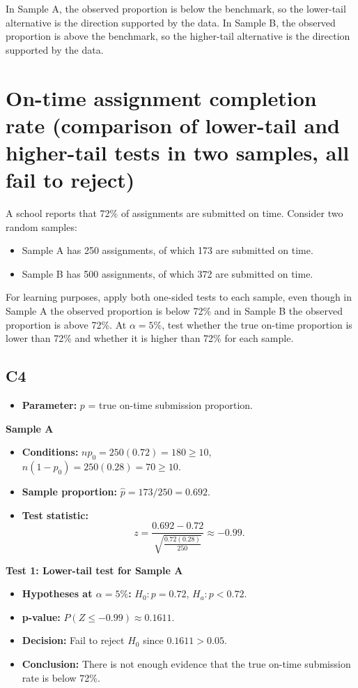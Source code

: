 In Sample A, the observed proportion is below the benchmark, so the lower-tail alternative is the direction supported by the data. In Sample B, the observed proportion is above the benchmark, so the higher-tail alternative is the direction supported by the data.

\section{On-time assignment completion rate (comparison of lower-tail and higher-tail tests in two samples, all fail to reject)}
A school reports that 72\% of assignments are submitted on time. Consider two random samples:
\begin{itemize}
	\item Sample A has 250 assignments, of which 173 are submitted on time.
	\item Sample B has 500 assignments, of which 372 are submitted on time.
\end{itemize}
For learning purposes, apply both one-sided tests to each sample, even though in Sample A the observed proportion is below 72\% and in Sample B the observed proportion is above 72\%. At \(\alpha=5\%\), test whether the true on-time proportion is lower than 72\% and whether it is higher than 72\% for each sample.

\subsection*{C4}
\begin{itemize}
	\item \textbf{Parameter:} \(p\) = true on-time submission proportion.
\end{itemize}

\textbf{Sample A}

\begin{itemize}
	\item \textbf{Conditions:} \(np_0=250(0.72)=180\ge10\), \(n(1-p_0)=250(0.28)=70\ge10\).
	\item \textbf{Sample proportion:} \(\hat p=173/250=0.692\).
	\item \textbf{Test statistic:}
	\[
	z=\frac{0.692-0.72}{\sqrt{\frac{0.72(0.28)}{250}}}\approx -0.99.
	\]
\end{itemize}

\textbf{Test 1: Lower-tail test for Sample A}

\begin{itemize}
	\item \textbf{Hypotheses at \(\alpha=5\%\):} \(H_0\colon p=0.72\), \(H_a\colon p<0.72\).
	\item \textbf{p-value:} \(P(Z\le -0.99)\approx 0.1611\).
	\item \textbf{Decision:} Fail to reject \(H_0\) since \(0.1611>0.05\).
	\item \textbf{Conclusion:} There is not enough evidence that the true on-time submission rate is below 72\%.
\end{itemize}

